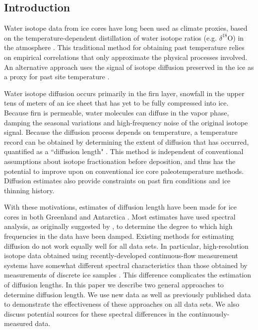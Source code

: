 \documentclass[draft, jgrga]{AGUTeX}
\begin{document}


\begin{article}

\section{Introduction}

Water isotope data from ice cores have long been used as climate proxies, based on the temperature-dependent distillation of water isotope ratios (e.g. $\delta^{18}$O) in the atmosphere \citep{Epstein1951,Dansgaard1954,Dansgaard1964}. This traditional method for obtaining past temperature relies on empirical correlations that only approximate the physical processes involved. An alternative approach uses the signal of isotope diffusion preserved in the ice as a proxy for past site temperature \citep{Johnsen2000}.

Water isotope diffusion occurs primarily in the firn layer, snowfall in the upper tens of meters of an ice sheet that has yet to be fully compressed into ice. Because firn is permeable, water molecules can diffuse in the vapor phase, damping the seasonal variations and high-frequency noise of the original isotope signal. Because the diffusion process depends on temperature, a temperature record can be obtained by determining the extent of diffusion that has occurred, quantified as a ``diffusion length" \citep{Johnsen2000}. This method is independent of conventional assumptions about isotope fractionation before deposition, and thus has the potential to improve upon on conventional ice core paleotemperature methods. Diffusion estimates also provide constraints on past firn conditions and ice thinning history.

With these motivations, estimates of diffusion length have been made for ice cores in both Greenland and Antarctica \citep{Simonsen2011,Gkinis2014,vanderWel2015,Jones2017a,Holme2017}. Most estimates have used spectral analysis, as originally suggested by \citet{Johnsen1977}, to determine the degree to which high frequencies in the data have been damped. Existing methods for estimating diffusion do not work equally well for all data sets. In particular, high-resolution isotope data obtained using recently-developed continuous-flow measurement systems have somewhat different spectral characteristics than those obtained by measurements of discrete ice samples \citep{Jones2017a}. This difference complicates the estimation of diffusion lengths. In this paper we describe two general approaches to determine diffusion length. We use new data as well as previously published data to demonstrate the effectiveness of these approaches on all data sets. We also discuss potential sources for these spectral differences in the continuously-measured data.


\end{article}
\end{document}
